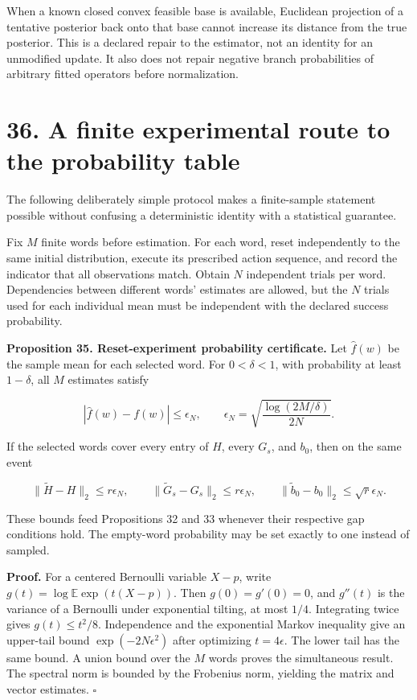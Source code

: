 \documentclass[11pt,letterpaper]{article}
\begin{document}
When a known closed convex feasible base is available, Euclidean
projection of a tentative posterior back onto that base cannot increase
its distance from the true posterior. This is a declared repair to the
estimator, not an identity for an unmodified update. It also does not
repair negative branch probabilities of arbitrary fitted operators
before normalization.

\section{36. A finite experimental route to the probability
table}\label{a-finite-experimental-route-to-the-probability-table}

The following deliberately simple protocol makes a finite-sample
statement possible without confusing a deterministic identity with a
statistical guarantee.

Fix \(M\) finite words before estimation. For each word, reset
independently to the same initial distribution, execute its prescribed
action sequence, and record the indicator that all observations match.
Obtain \(N\) independent trials per word. Dependencies between different
words' estimates are allowed, but the \(N\) trials used for each
individual mean must be independent with the declared success
probability.

\textbf{Proposition 35. Reset-experiment probability certificate.} Let
\(\widehat f(w)\) be the sample mean for each selected word. For
\(0<\delta<1\), with probability at least \(1-\delta\), all \(M\)
estimates satisfy

\[
|\widehat f(w)-f(w)|\leq
\epsilon_N,\qquad
\epsilon_N=\sqrt{\frac{\log(2M/\delta)}{2N}}.
\]

If the selected words cover every entry of \(H\), every \(G_s\), and
\(b_0\), then on the same event

\[
\|\widetilde H-H\|_2\leq r\epsilon_N,\qquad
\|\widetilde G_s-G_s\|_2\leq r\epsilon_N,\qquad
\|\widetilde b_0-b_0\|_2\leq\sqrt r\epsilon_N.
\]

These bounds feed Propositions 32 and 33 whenever their respective gap
conditions hold. The empty-word probability may be set exactly to one
instead of sampled.

\textbf{Proof.} For a centered Bernoulli variable \(X-p\), write
\(g(t)=\log\mathbb E\exp(t(X-p))\). Then \(g(0)=g'(0)=0\), and
\(g''(t)\) is the variance of a Bernoulli under exponential tilting, at
most \(1/4\). Integrating twice gives \(g(t)\leq t^2/8\). Independence
and the exponential Markov inequality give an upper-tail bound
\(\exp(-2N\epsilon^2)\) after optimizing \(t=4\epsilon\). The lower tail
has the same bound. A union bound over the \(M\) words proves the
simultaneous result. The spectral norm is bounded by the Frobenius norm,
yielding the matrix and vector estimates. \(\square\)
\end{document}
